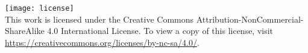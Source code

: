 \begin{center}
\texttt{[image: license]}\\
This work is licensed under the Creative Commons Attribution-NonCommercial-ShareAlike 4.0 International License.
To view a copy of this license, visit \url{https://creativecommons.org/licenses/by-nc-sa/4.0/}.
\end{center}

